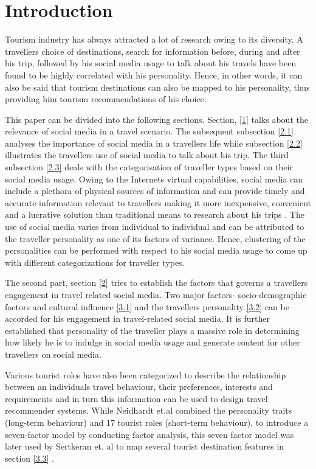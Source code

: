 \section{Introduction}
		
Tourism industry has always attracted a lot of research owing to its diversity. A traveller\textquotesingle s choice of destinations, search for information before, during and after his trip, followed by his social media usage to talk about his travels have been found to be highly correlated with his personality. Hence, in other words, it can also be said that tourism destinations can also be mapped to his personality, thus providing him tourism recommendations of his choice. 		

This paper can be divided into the following sections. Section, \ref{1} talks about the relevance of social media in a travel scenario. The subsequent subsection \ref{2.1} analyses the importance of social media in a traveller\textquotesingle s life while subsection \ref{2.2} illustrates the traveller\textquotesingle s use of social media to talk about his trip. The third subsection \ref{2.3} deals with the categorisation of traveller types based on their social media usage. Owing to the Internet\textquotesingle s virtual capabilities, social media can include a plethora of physical sources of information and can provide timely and accurate information relevant to travellers making it more inexpensive, convenient and a lucrative solution than traditional means to research about his trips \cite{amaro2016travelers}. The use of social media varies from individual to individual and can be attributed to the traveller personality as one of its factors of variance. Hence, clustering of the personalities can be performed with respect to his social media usage to come up with different categorizations for traveller types.
				
The second part, section \ref{2} tries to establish the factors that governs a traveller\textquotesingle s engagement in travel related social media. Two major factors- socio-demographic factors and cultural influence \ref{3.1} and the traveller\textquotesingle s personality \ref{3.2} can be accorded for his engagement in travel-related social media. It is further established that personality of the traveller plays a massive role in determining how likely he is to indulge in social media usage and generate content for other travellers on social media. 

Various tourist roles have also been categorized to describe the relationship between an individual\textquotesingle s travel behaviour, their preferences, interests and requirements and in turn this information can be used to design travel recommender systems. While Neidhardt et.al \cite{neidhardt2015picture}\cite{neidhardt2014eliciting} combined the personality traits (long-term behaviour) and 17
tourist roles (short-term behaviour), to introduce a seven-factor
model by conducting factor analysis, this seven factor model was later used by Sertkeran et. al to map several tourist destination features in section \ref{3.3} \cite{sertkan2018mapping}.



